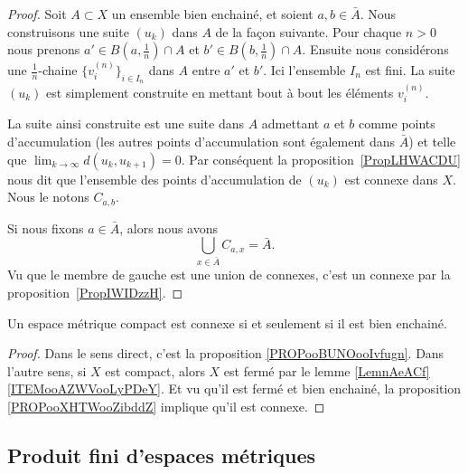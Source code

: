 \begin{proof}
	Soit \( A\subset X\) un ensemble bien enchainé, et soient \( a,b\in \bar A\). Nous construisons une suite \( (u_k)\) dans \( A\) de la façon suivante. Pour chaque \( n>0\) nous prenons \( a'\in B(a,\frac{1}{ n })\cap A\) et \( b'\in B(b,\frac{1}{ n })\cap A\). Ensuite nous considérons une \( \frac{1}{ n }\)-chaine \( \{ v_i^{(n)} \}_{i\in I_n}\) dans \( A\) entre \( a'\) et \( b'\). Ici l'ensemble \( I_n\) est fini. La suite \( (u_k)\) est simplement construite en mettant bout à bout les éléments \( v_i^{(n)}\).

	La suite ainsi construite est une suite dans \( A\) admettant \( a\) et \( b\) comme points d'accumulation (les autres points d'accumulation sont également dans \( \bar A\)) et telle que \( \lim_{k\to \infty} d(u_k,u_{k+1})=0\). Par conséquent la proposition~\ref{PropLHWACDU} nous dit que l'ensemble des points d'accumulation de \( (u_k)\) est connexe dans \( X\). Nous le notons \( C_{a,b}\).

	Si nous fixons \( a\in \bar A\), alors nous avons
	\begin{equation}
		\bigcup_{x\in \bar A}C_{a,x}=\bar A.
	\end{equation}
	Vu que le membre de gauche est une union de connexes, c'est un connexe par la proposition~\ref{PropIWIDzzH}.
\end{proof}

\begin{corollary}       \label{CORooSIKCooTncoQm}
	Un espace métrique compact est connexe si et seulement si il est bien enchainé.
\end{corollary}

\begin{proof}
	Dans le sens direct, c'est la proposition \ref{PROPooBUNOooIvfugn}. Dans l'autre sens, si \( X\) est compact, alors \( X\) est fermé par le lemme \ref{LemnAeACf}\ref{ITEMooAZWVooLyPDeY}. Et vu qu'il est fermé et bien enchainé, la proposition \ref{PROPooXHTWooZibddZ} implique qu'il est connexe.
\end{proof}

\subsection{Produit fini d'espaces métriques}

